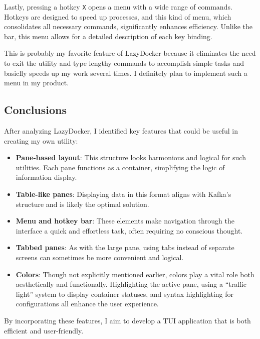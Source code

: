 \documentclass[10pt , a4paper]{report}
\begin{document}
Lastly, pressing a hotkey \texttt{X} opens a menu with a wide range of commands. Hotkeys are designed to speed up processes, and this kind of menu, which consolidates all necessary commands, significantly enhances efficiency. Unlike the bar, this menu allows for a detailed description of each key binding.

This is probably my favorite feature of LazyDocker because it eliminates the need to exit the utility and type lengthy commands to accomplish simple tasks and basiclly speeds up my work several times. I definitely plan to implement such a menu in my product.


\subsection{Conclusions}

After analyzing LazyDocker, I identified key features that could be useful in creating my own utility:

\begin{itemize}
    \item \textbf{Pane-based layout}: This structure looks harmonious and logical for such utilities. Each pane functions as a container, simplifying the logic of information display.
    \item \textbf{Table-like panes}: Displaying data in this format aligns with Kafka’s structure and is likely the optimal solution.
    \item \textbf{Menu and hotkey bar}: These elements make navigation through the interface a quick and effortless task, often requiring no conscious thought.
    \item \textbf{Tabbed panes}: As with the large pane, using tabs instead of separate screens can sometimes be more convenient and logical.
    \item \textbf{Colors}: Though not explicitly mentioned earlier, colors play a vital role both aesthetically and functionally. Highlighting the active pane, using a “traffic light” system to display container statuses, and syntax highlighting for configurations all enhance the user experience.
\end{itemize}

By incorporating these features, I aim to develop a TUI application that is both efficient and user-friendly.

\newpage
\end{document}

